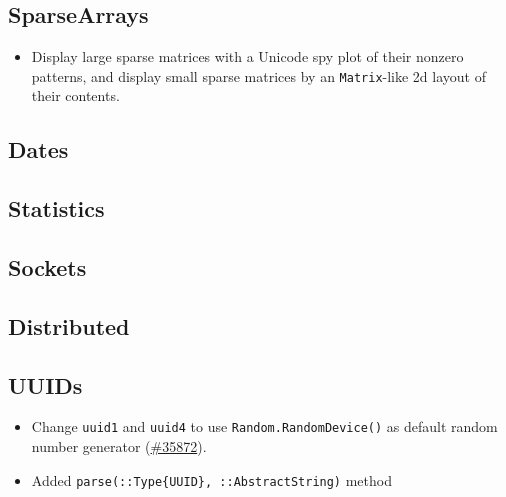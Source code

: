 \hypertarget{8318560296908757234}{}


\subsection{SparseArrays}



\begin{itemize}
\item Display large sparse matrices with a Unicode {\textquotedbl}spy{\textquotedbl} plot of their nonzero patterns, and display small sparse matrices by an \texttt{Matrix}-like 2d layout of their contents.

\end{itemize}


\hypertarget{9507963728197011587}{}


\subsection{Dates}



\hypertarget{9437621938979276328}{}


\subsection{Statistics}



\hypertarget{3574674985174674746}{}


\subsection{Sockets}



\hypertarget{13830325491332105953}{}


\subsection{Distributed}



\hypertarget{2767829618755343548}{}


\subsection{UUIDs}



\begin{itemize}
\item Change \texttt{uuid1} and \texttt{uuid4} to use \texttt{Random.RandomDevice()} as default random number generator (\href{https://github.com/JuliaLang/julia/issues/35872}{\#35872}).


\item Added \texttt{parse(::Type\{UUID\}, ::AbstractString)} method

\end{itemize}


